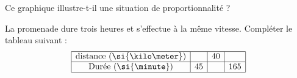 
\begin{exercice}\label{exosmath-0948}

Ce graphique illustre-t-il une situation de proportionnalité ?

\begin{center}
   
\end{center}

La promenade dure trois heures et s'effectue à la même vitesse. Compléter le tableau suivant :
\begin{equation*}
    \begin{array}[]{|c|c|c|c|}
        \hline
        \text{distance (\si{\kilo\meter})}&&40&\\
          \hline
          \text{Durée (\si{\minute})}&45&&165\\
          \hline
    \end{array}
\end{equation*}

\end{exercice}
